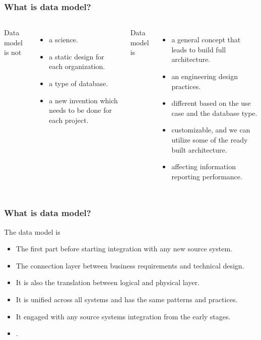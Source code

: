\begin{frame}
    \frametitle{What is data model?}

    \begin{columns}

        Data model is not
        \begin{itemize}[<+->]
            \item a science.
            \item a static design for each organization.
            \item a type of database.
            \item a new invention which needs to be done for each project.
        \end{itemize}


        Data model is
        \begin{itemize}[<+->]
            \item a general concept that leads to build full architecture.
            \item an engineering design practices.
            \item different based on the use case and the database type.
            \item customizable, and we can utilize some of the ready built architecture.
            \item affecting information reporting performance.
        \end{itemize}

    \end{columns}

\end{frame}


\begin{frame}
    \frametitle{What is data model?}
    The data model is
    \begin{itemize}[<+->]
        \item The first part before starting integration with any new source system.
        \item The connection layer between business requirements and technical design.
        \item It is also the translation between logical and physical layer.
        \item It is unified across all systems and has the same patterns and practices.
        \item It engaged with any source systems integration from the early stages.
        \item {}.
    \end{itemize}
\end{frame}

